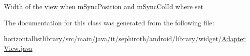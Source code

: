 Width of the view when m\+Sync\+Position and m\+Sync\+Col\+Id where set 

The documentation for this class was generated from the following file\+:\begin{DoxyCompactItemize}
\item 
horizontallistlibrary/src/main/java/it/sephiroth/android/library/widget/\hyperlink{_adapter_view_8java}{Adapter\+View.\+java}\end{DoxyCompactItemize}
